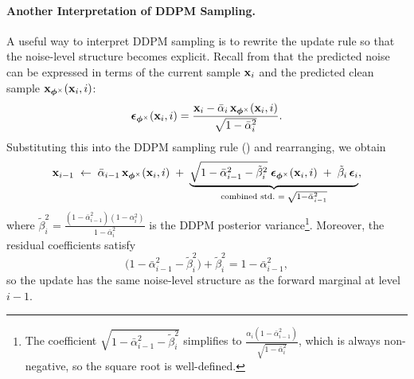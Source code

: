






\paragraph{Another Interpretation of DDPM Sampling.}

A useful way to interpret DDPM sampling is to rewrite the update rule
so that the noise-level structure becomes explicit.
Recall from  that the predicted noise can be
expressed in terms of the current sample ${\mathbf{x}}_i$ and the predicted
clean sample ${\mathbf{x}}_{\bm{\phi}^\times}({\mathbf{x}}_i,i)$:
\[
\boldsymbol{\epsilon}_{\bm{\phi}^\times}({\mathbf{x}}_i,i)
=
\frac{{\mathbf{x}}_i - \bar{\alpha}_i\,{\mathbf{x}}_{\bm{\phi}^\times}({\mathbf{x}}_i,i)}
     {\sqrt{1-\bar{\alpha}_i^2}}.
\]
Substituting this into the DDPM sampling rule
() and rearranging, we obtain
\begin{equation}\label{eq:ddpm-renoise}
{\mathbf{x}}_{i-1}
\;\leftarrow\;
\bar{\alpha}_{i-1}\,{\mathbf{x}}_{\bm{\phi}^\times}({\mathbf{x}}_i,i)
\;+\;
\underbrace{
  \sqrt{1-\bar{\alpha}_{i-1}^2 - \tilde{\beta}_i^2}\;
  \boldsymbol{\epsilon}_{\bm{\phi}^\times}({\mathbf{x}}_i,i)
  \;+\;
  \tilde{\beta}_i\,\boldsymbol{\epsilon}_i
}_{\text{combined std.\ }=\;\sqrt{1-\bar{\alpha}_{i-1}^2}},
\end{equation}
where $\tilde{\beta}_i^2
= \frac{(1-\bar{\alpha}_{i-1}^2)(1-\alpha_i^2)}{1-\bar{\alpha}_i^2}$
is the DDPM posterior variance\footnote{%
The coefficient
$\sqrt{1-\bar{\alpha}_{i-1}^2 - \tilde{\beta}_i^2}$
simplifies to
$\frac{\alpha_i(1-\bar{\alpha}_{i-1}^2)}{\sqrt{1-\bar{\alpha}_i^2}}$,
which is always non-negative, so the square root is well-defined.}.
Moreover, the residual coefficients satisfy
\[
\bigl(1-\bar{\alpha}_{i-1}^2-\tilde{\beta}_i^2\bigr)+\tilde{\beta}_i^2
=
1-\bar{\alpha}_{i-1}^2,
\]
so the update has the same noise-level structure as the forward marginal
at level $i-1$.


